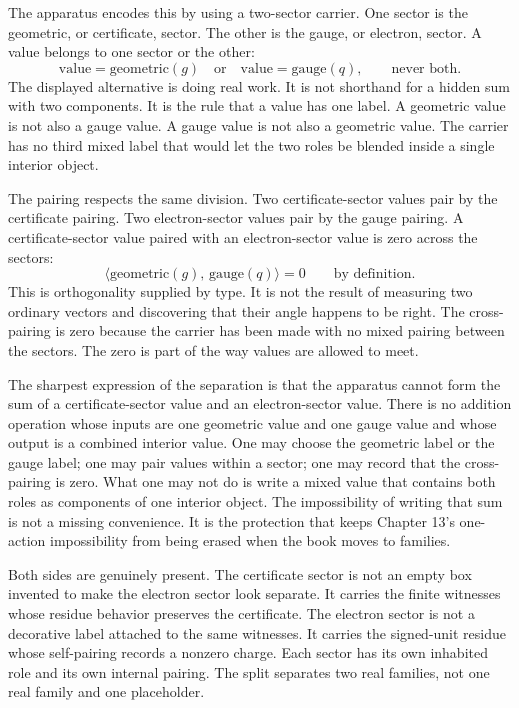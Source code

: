 The apparatus encodes this by using a two-sector carrier. One sector is the
geometric, or certificate, sector. The other is the gauge, or electron, sector.
A value belongs to one sector or the other:
\[
  \text{value} = \text{geometric}(g)
  \quad\text{or}\quad
  \text{value} = \text{gauge}(q),
  \qquad\text{never both.}
\]
The displayed alternative is doing real work. It is not shorthand for a hidden
sum with two components. It is the rule that a value has one label. A geometric
value is not also a gauge value. A gauge value is not also a geometric value.
The carrier has no third mixed label that would let the two roles be blended
inside a single interior object.

The pairing respects the same division. Two certificate-sector values pair by
the certificate pairing. Two electron-sector values pair by the gauge pairing.
A certificate-sector value paired with an electron-sector value is zero across
the sectors:
\[
  \langle \text{geometric}(g),\, \text{gauge}(q) \rangle = 0
  \qquad\text{by definition.}
\]
This is orthogonality supplied by type. It is not the result of measuring two
ordinary vectors and discovering that their angle happens to be right. The
cross-pairing is zero because the carrier has been made with no mixed pairing
between the sectors. The zero is part of the way values are allowed to meet.

The sharpest expression of the separation is that the apparatus cannot form the
sum of a certificate-sector value and an electron-sector value. There is no
addition operation whose inputs are one geometric value and one gauge value and
whose output is a combined interior value. One may choose the geometric label or
the gauge label; one may pair values within a sector; one may record that the
cross-pairing is zero. What one may not do is write a mixed value that contains
both roles as components of one interior object. The impossibility of writing
that sum is not a missing convenience. It is the protection that keeps Chapter
13's one-action impossibility from being erased when the book moves to
families.

Both sides are genuinely present. The certificate sector is not an empty box
invented to make the electron sector look separate. It carries the finite
witnesses whose residue behavior preserves the certificate. The electron sector
is not a decorative label attached to the same witnesses. It carries the
signed-unit residue whose self-pairing records a nonzero charge. Each sector has
its own inhabited role and its own internal pairing. The split separates two
real families, not one real family and one placeholder.

